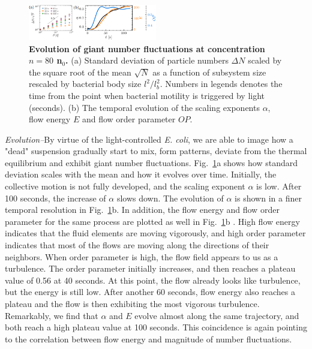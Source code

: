 \documentclass[twocolumn,aps,prl,amsmath,amssymb,longbibliography]{revtex4-1}
\begin{document}
\begin{figure}[ht]
\begin{center}
\includegraphics[width=0.5\textwidth]{figures/fig-4-v2.png}
\caption[]{\textbf{Evolution of giant number fluctuations at concentration $n=80$ n$_0$.} (a) Standard deviation of particle numbers $\Delta N$ scaled by the square root of the mean $\sqrt N$ as a function of subsystem size rescaled by bacterial body size $l^2/l_b^2$. Numbers in legends denotes the time from the point when bacterial motility is triggered by light (seconds). (b) The temporal evolution of the scaling exponents $\alpha$, flow energy $E$ and flow order parameter $OP$.}
\label{fig:4}
\end{center}
\end{figure}

\textit{Evolution--}By virtue of the light-controlled \textit{E. coli}, we are able to image how a "dead" suspension gradually start to mix, form patterns, deviate from the thermal equilibrium and exhibit giant number fluctuations. Fig.~\ref{fig:4}a shows how standard deviation scales with the mean and how it evolves over time. Initially, the collective motion is not fully developed, and the scaling exponent $\alpha$ is low. After 100 seconds, the increase of $\alpha$ slows down. The evolution of $\alpha$ is shown in a finer temporal resolution in Fig.~\ref{fig:4}b. In addition, the flow energy and flow order parameter for the same process are plotted as well in Fig.~\ref{fig:4}b \cite{Peng2020}. High flow energy indicates that the fluid elements are moving vigorously, and high order parameter indicates that most of the flows are moving along the directions of their neighbors. When order parameter is high, the flow field appears to us as a turbulence. The order parameter initially increases, and then reaches a plateau value of 0.56 at 40 seconds. At this point, the flow already looks like turbulence, but the energy is still low. After another 60 seconds, flow energy also reaches a plateau and the flow is then exhibiting the most vigorous turbulence. Remarkably, we find that $\alpha$ and $E$ evolve almost along the same trajectory, and both reach a high plateau value at 100 seconds. This coincidence is again pointing to the correlation between flow energy and magnitude of number fluctuations.
\end{document}
